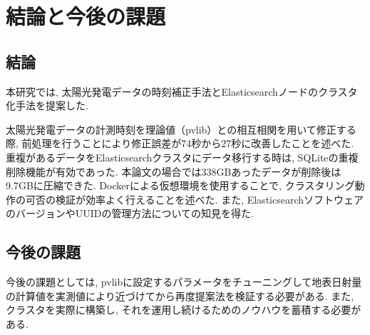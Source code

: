 \chapter{結論と今後の課題}
\label{chap:fifth}

\section{結論}




本研究では, 太陽光発電データの時刻補正手法とElasticsearchノードのクラスタ化手法を提案した.

太陽光発電データの計測時刻を理論値（pvlib）との相互相関を用いて修正する際, 前処理を行うことにより修正誤差が74秒から27秒に改善したことを述べた. 重複があるデータをElasticsearchクラスタにデータ移行する時は, SQLiteの重複削除機能が有効であった. 本論文の場合では338GBあったデータが削除後は9.7GBに圧縮できた.  Dockerによる仮想環境を使用することで, クラスタリング動作の可否の検証が効率よく行えることを述べた. また, ElasticsearchソフトウェアのバージョンやUUIDの管理方法についての知見を得た.

\section{今後の課題}

今後の課題としては, pvlibに設定するパラメータをチューニングして地表日射量の計算値を実測値により近づけてから再度提案法を検証する必要がある. また, クラスタを実際に構築し, それを運用し続けるためのノウハウを蓄積する必要がある.

